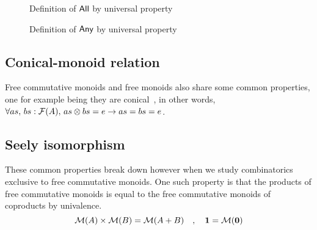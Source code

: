 \begin{figure}[H]
    \centering
    \begin{minipage}[t]{0.49\textwidth}
        \centering
        \caption{Definition of $\operatorname{\mathsf{All}}$ by universal property}
        \label{fig:enter-label}
    \end{minipage}
    \begin{minipage}[t]{0.49\textwidth}
        \centering
        \caption{Definition of $\operatorname{\mathsf{Any}}$ by universal property}
        \label{fig:enter-label}
    \end{minipage}
\end{figure}

\subsection{Conical-monoid relation}
Free commutative monoids and free monoids also share some common properties, one for example being
they are conical~\cite{wehrungTensorProductsStructures1996},
in other words, $\forall as,\, bs : \mathcal{F}(A),\,as \otimes bs = e \to as = bs = e$.

\subsection{Seely isomorphism}
These common properties break down however when we study combinatorics exclusive to free commutative monoids.
One such property is that the products of free commutative monoids
is equal to the free commutative monoids of coproducts by univalence.
\begin{equation*}
    \mathcal{M}(A) \times \mathcal{M}(B) = \mathcal{M}(A + B)\quad,\quad{\mathbf{1}} = \mathcal{M}({\mathbf{0}})
\end{equation*}


